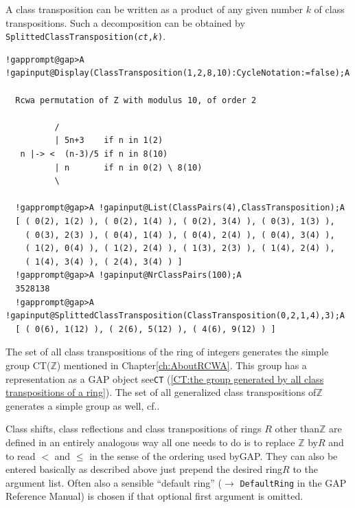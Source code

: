 \documentclass[a4paper,11pt]{report}
\begin{document}
{{{  A class transposition can be written as a product of any given number $k$ of class transpositions. Such a decomposition can be obtained by \texttt{SplittedClassTransposition(\mbox{\texttt{\mdseries\slshape ct}},\mbox{\texttt{\mdseries\slshape k}})}. 

 
\begin{Verbatim}[commandchars=!@A,fontsize=\small,frame=single,label=Example]
  !gapprompt@gap>A !gapinput@Display(ClassTransposition(1,2,8,10):CycleNotation:=false);A
  
  Rcwa permutation of Z with modulus 10, of order 2
  
          /
          | 5n+3    if n in 1(2)
   n |-> <  (n-3)/5 if n in 8(10)
          | n       if n in 0(2) \ 8(10)
          \
  
  !gapprompt@gap>A !gapinput@List(ClassPairs(4),ClassTransposition);A
  [ ( 0(2), 1(2) ), ( 0(2), 1(4) ), ( 0(2), 3(4) ), ( 0(3), 1(3) ), 
    ( 0(3), 2(3) ), ( 0(4), 1(4) ), ( 0(4), 2(4) ), ( 0(4), 3(4) ), 
    ( 1(2), 0(4) ), ( 1(2), 2(4) ), ( 1(3), 2(3) ), ( 1(4), 2(4) ), 
    ( 1(4), 3(4) ), ( 2(4), 3(4) ) ]
  !gapprompt@gap>A !gapinput@NrClassPairs(100);A
  3528138
  !gapprompt@gap>A !gapinput@SplittedClassTransposition(ClassTransposition(0,2,1,4),3);A
  [ ( 0(6), 1(12) ), ( 2(6), 5(12) ), ( 4(6), 9(12) ) ]
\end{Verbatim}
 }

 \noindent The set of all class transpositions of the ring of integers generates the
simple group CT({\ensuremath{\mathbb Z}}) mentioned in Chapter{\nobreakspace}\ref{ch:AboutRCWA}. This group has a representation as a \textsf{GAP} object \texttt{}\texttt{} see{\nobreakspace}\texttt{CT} (\ref{CT:the group generated by all class transpositions of a ring}). The set of all generalized class transpositions
of{\nobreakspace}{\ensuremath{\mathbb Z}} generates a simple group as well,
cf.{\nobreakspace}\cite{Kohl09}. 

 Class shifts, class reflections and class transpositions of rings $R$ other than{\nobreakspace}{\ensuremath{\mathbb Z}} are defined in an entirely
analogous way \texttt{}\texttt{} all one needs to do is
to replace {\ensuremath{\mathbb Z}} by{\nobreakspace}$R$ and to read $<$ and $\leq$ in the sense of the ordering used by{\nobreakspace}\textsf{GAP}. They can also be entered basically as described above
\texttt{}\texttt{} just prepend the desired
ring{\nobreakspace}$R$ to the argument list. Often also a sensible ``default ring'' ($\rightarrow$ \texttt{DefaultRing} in the \textsf{GAP} Reference Manual) is chosen if that optional first argument is omitted. 

}}
\end{document}
